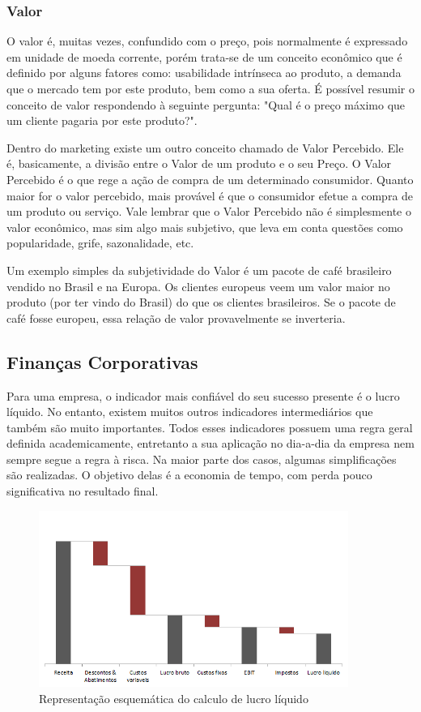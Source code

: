 \documentclass[12pt]{article}
\begin{document}
\subsubsection{Valor}

	O valor é, muitas vezes, confundido com o preço, pois normalmente é expressado em unidade de moeda corrente, porém trata-se de um conceito econômico que é definido por alguns fatores como: usabilidade intrínseca ao produto, a demanda que o mercado tem por este produto, bem como a sua oferta. É possível resumir o conceito de valor respondendo à seguinte pergunta: "Qual é o preço máximo que um cliente pagaria por este produto?".

	Dentro do marketing existe um outro conceito chamado de Valor Percebido. Ele é, basicamente, a divisão entre o Valor de um produto e o seu Preço. O Valor Percebido é o que rege a ação de compra de um determinado consumidor. Quanto maior for o valor percebido, mais provável é que o consumidor efetue a compra de um produto ou serviço. Vale lembrar que o Valor Percebido não é simplesmente o valor econômico, mas sim algo mais subjetivo, que leva em conta questões como popularidade, grife, sazonalidade, etc.

	Um exemplo simples da subjetividade do Valor é um pacote de café brasileiro vendido no Brasil e na Europa. Os clientes europeus veem um valor maior no produto (por ter vindo do Brasil) do que os clientes brasileiros. Se o pacote de café fosse europeu, essa relação de valor provavelmente se inverteria.

\subsection{Finanças Corporativas}

	Para uma empresa, o indicador mais confiável do seu sucesso presente é o lucro líquido. No entanto, existem muitos outros indicadores intermediários que também são muito importantes. Todos esses indicadores possuem uma regra geral definida academicamente, entretanto a sua aplicação no dia-a-dia da empresa nem sempre segue a regra à risca. Na maior parte dos casos, algumas simplificações são realizadas. O objetivo delas é a economia de tempo, com perda pouco significativa no resultado final.

\begin{figure}[h!]
	\centering
	\includegraphics[width=0.9\textwidth]{img/finance.png}
	\caption{Representação esquemática do calculo de lucro líquido}
	\label{fig:lucro}
\end{figure}
\end{document}
